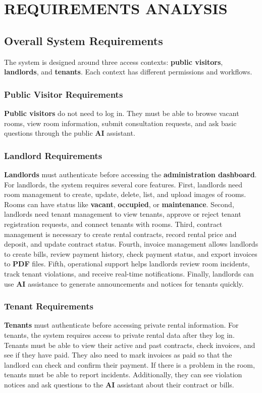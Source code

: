 \chapter{REQUIREMENTS ANALYSIS}

\section{Overall System Requirements}
The system is designed around three access contexts: \textbf{public visitors}, \textbf{landlords}, and \textbf{tenants}. Each context has different permissions and workflows.

\subsection{Public Visitor Requirements}
\textbf{Public visitors} do not need to log in. They must be able to browse vacant rooms, view room information, submit consultation requests, and ask basic questions through the public \textbf{AI} assistant.

\subsection{Landlord Requirements}
\textbf{Landlords} must authenticate before accessing the \textbf{administration dashboard}. For landlords, the system requires several core features. First, landlords need room management to create, update, delete, list, and upload images of rooms. Rooms can have status like \textbf{vacant}, \textbf{occupied}, or \textbf{maintenance}. Second, landlords need tenant management to view tenants, approve or reject tenant registration requests, and connect tenants with rooms. Third, contract management is necessary to create rental contracts, record rental price and deposit, and update contract status. Fourth, invoice management allows landlords to create bills, review payment history, check payment status, and export invoices to \textbf{PDF} files. Fifth, operational support helps landlords review room incidents, track tenant violations, and receive real-time notifications. Finally, landlords can use \textbf{AI} assistance to generate announcements and notices for tenants quickly.

\subsection{Tenant Requirements}
\textbf{Tenants} must authenticate before accessing private rental information. For tenants, the system requires access to private rental data after they log in. Tenants must be able to view their active and past contracts, check invoices, and see if they have paid. They also need to mark invoices as paid so that the landlord can check and confirm their payment. If there is a problem in the room, tenants must be able to report incidents. Additionally, they can see violation notices and ask questions to the \textbf{AI} assistant about their contract or bills.

